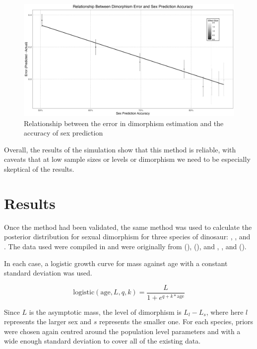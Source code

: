 \documentclass[letterpaper]{article}
\begin{document}
\begin{figure}[H]
	\centering
	\includegraphics[width = \textwidth]{images/alligatorSexPredictionAccuracyDimorphismError.png}
	\caption{Relationship between the error in dimorphism estimation and the accuracy of sex prediction}
	\label{fig:alligatorSexPredictionError}
\end{figure}

Overall, the results of the simulation show that this method is reliable, with caveats that at low sample sizes or levels or dimorphism we need to be especially skeptical of the results.


\section{Results}

Once the method had been validated, the same method was used to calculate the posterior distribution for sexual dimorphism for three species of dinosaur: \maia{}, \psit{}, and \tyran{}. The data used were compiled in \cite{saittaEffectSizeStatistical2020} and were originally from \cite{woodwardMaiasauraModelOrganism2015} (\maia), \cite{ericksonFlawedAnalysisResponse2015}  (\psit), and \cite{ericksonGigantismComparativeLifehistory2004}, \cite{hornerAgeGrowthDynamics2004}, and \cite{leeSexualMaturityGrowing2008} (\tyran).

In each case, a logistic growth curve for mass against age with a constant standard deviation was used.

$$
\text{logistic}(\text{age}, L, q, k) = \frac{L}{1 + e^{q+k \ast \text{age}}}
$$

Since $L$ is the asymptotic mass, the level of dimorphism is $L_l - L_s$, where here $l$ represents the larger sex and $s$ represents the smaller one. For each species, priors were chosen again centred around the population level parameters and with a wide enough standard deviation to cover all of the existing data.
\end{document}
